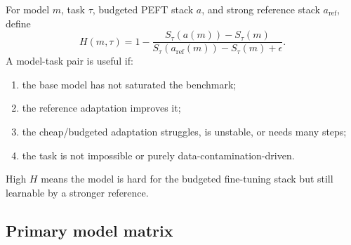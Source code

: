 \documentclass[11pt]{article}
\begin{document}
For model $m$, task $\tau$, budgeted PEFT stack $a$, and strong reference stack $a_{\mathrm{ref}}$, define
\[
    H(m,\tau)
    =
    1-
    \frac{S_\tau(a(m))-S_\tau(m)}{S_\tau(a_{\mathrm{ref}}(m))-S_\tau(m)+\epsilon}.
\]
A model-task pair is useful if:
\begin{enumerate}[leftmargin=*]
    \item the base model has not saturated the benchmark;
    \item the reference adaptation improves it;
    \item the cheap/budgeted adaptation struggles, is unstable, or needs many steps;
    \item the task is not impossible or purely data-contamination-driven.
\end{enumerate}
High $H$ means the model is hard for the budgeted fine-tuning stack but still learnable by a stronger reference.

\subsection{Primary model matrix}
\end{document}

